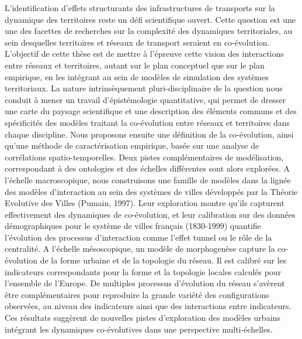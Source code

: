 L'identification d'effets structurants des infrastructures de transports sur la dynamique des territoires reste un défi scientifique ouvert. Cette question est une une des facettes de recherches sur la complexité des dynamiques territoriales, au sein desquelles territoires et réseaux de transport seraient en co-évolution. L'objectif de cette thèse est de mettre à l'épreuve cette vision des interactions entre réseaux et territoires, autant sur le plan conceptuel que sur le plan empirique, en les intégrant au sein de modèles de simulation des systèmes territoriaux. La nature intrinsèquement pluri-disciplinaire de la question nous conduit à mener un travail d'épistémologie quantitative, qui permet de dresser une carte du paysage scientifique et une description des éléments communs et des spécificités des modèles traitant la co-évolution entre réseaux et territoires dans chaque discipline. Nous proposons ensuite une définition de la co-évolution, ainsi qu'une méthode de caractérisation empirique, basée sur une analyse de corrélations spatio-temporelles. Deux pistes complémentaires de modélisation, correspondant à des ontologies et des échelles différentes sont alors explorées. A l'échelle macroscopique, nous construisons une famille de modèles dans la lignée des modèles d'interaction au sein des systèmes de villes développés par la Théorie Evolutive des Villes (Pumain, 1997). Leur exploration montre qu'ils capturent effectivement des dynamiques de co-évolution, et leur calibration sur des données démographiques pour le système de villes français (1830-1999) quantifie l'évolution des processus d'interaction comme l'effet tunnel ou le rôle de la centralité. A l'échelle mésoscopique, un modèle de morphogenèse capture la co-évolution de la forme urbaine et de la topologie du réseau. Il est calibré sur les indicateurs correspondants pour la forme et la topologie locales calculés pour l'ensemble de l'Europe. De multiples processus d'évolution du réseau s'avèrent être complémentaires pour reproduire la grande variété des configurations observées, au niveau des indicateurs ainsi que des interactions entre indicateurs. Ces résultats suggèrent de nouvelles pistes d'exploration des modèles urbains intégrant les dynamiques co-évolutives dans une perspective multi-échelles.





\newpage



